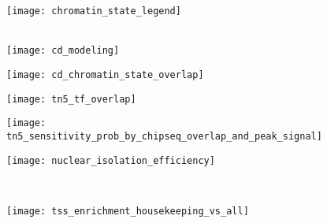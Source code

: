 \documentclass{article}
\begin{document}
\begin{figure}
\texttt{[image: chromatin\_state\_legend]}\\
\vspace{1cm}
\hspace{0.25cm}
\hspace{0.25cm}
\\
\hspace{0.25cm}
\hspace{0.25cm}
\caption{}
\end{figure}

\begin{figure}
\texttt{[image: cd\_modeling]}
\caption{}
\end{figure}

\begin{figure}
\texttt{[image: cd\_chromatin\_state\_overlap]}
\caption{}
\end{figure}


\begin{figure}
\texttt{[image: tn5\_tf\_overlap]}
\caption{}
\end{figure}

\begin{figure}
\texttt{[image: tn5\_sensitivity\_prob\_by\_chipseq\_overlap\_and\_peak\_signal]}
\caption{}
\end{figure}

\begin{figure}
\texttt{[image: nuclear\_isolation\_efficiency]}
\caption{}
\end{figure}


\begin{figure}
\\
\caption{}
\end{figure}


\begin{figure}
\texttt{[image: tss\_enrichment\_housekeeping\_vs\_all]}
\caption{}
\end{figure}
\end{document}
